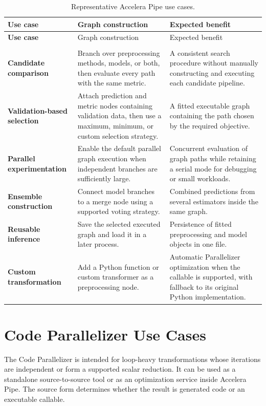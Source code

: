 \documentclass[12pt,a4paper]{report}
\newcommand{\acceleraTableStyle}{%
\small
\renewcommand{\arraystretch}{1.15}
\setlength{\tabcolsep}{4pt}%
}
\begin{document}
{\acceleraTableStyle
\renewcommand{\arraystretch}{1.02}
\setlength{\tabcolsep}{3pt}
\begin{longtable}{>{\bfseries}p{} p{} p{}}
\caption{Representative Accelera Pipe use cases.}
\label{tab:accelera-pipe-use-cases} \\
\toprule
Use case & Graph construction & Expected benefit \\
\midrule
\endfirsthead
\toprule
Use case & Graph construction & Expected benefit \\
\midrule
\endhead
\midrule
\multicolumn{3}{r}{\small Continued on the next page} \\
\endfoot
\bottomrule
\endlastfoot
Candidate comparison & Branch over preprocessing methods, models, or both,
then evaluate every path with the same metric. & A consistent search procedure
without manually constructing and executing each candidate pipeline. \\
\addlinespace
Validation-based selection & Attach prediction and metric nodes containing
validation data, then use a maximum, minimum, or custom selection strategy. & A
fitted executable graph containing the path chosen by the required objective. \\
\addlinespace
Parallel experimentation & Enable the default parallel graph execution when
independent branches are sufficiently large. & Concurrent evaluation of graph
paths while retaining a serial mode for debugging or small workloads. \\
\addlinespace
Ensemble construction & Connect model branches to a merge node using a
supported voting strategy. & Combined predictions from several estimators
inside the same graph. \\
\addlinespace
Reusable inference & Save the selected executed graph and load it in a later
process. & Persistence of fitted preprocessing and model objects in one file. \\
\addlinespace
Custom transformation & Add a Python function or custom transformer as a
preprocessing node. & Automatic Parallelizer optimization when the callable is
supported, with fallback to its original Python implementation. \\
\end{longtable}
}

\section{Code Parallelizer Use Cases}
The Code Parallelizer is intended for loop-heavy transformations whose
iterations are independent or form a supported scalar reduction. It can be
used as a standalone source-to-source tool or as an optimization service inside
Accelera Pipe. The source form determines whether the result is generated code
or an executable callable.
\end{document}
